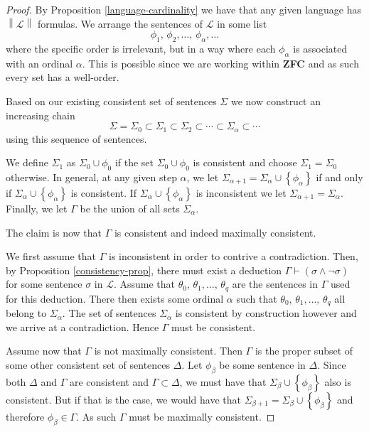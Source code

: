 \documentclass[../../main.tex]{subfiles}
\begin{document}
\begin{proof} 
    By Proposition \ref{language-cardinality} we have that any given language has $\left\lVert \mathcal{L}\right\rVert$ formulas.
    We arrange the sentences of $\mathcal{L}$ in some list
    $$\phi_1,\, \phi_2,\ldots,\, \phi_{\alpha},\ldots$$
    where the specific order is irrelevant, but in a way where each $\phi_{\alpha}$ is associated with an ordinal $\alpha$.
    This is possible since we are working within \textbf{ZFC} and as such every set has a well-order.

    Based on our existing consistent set of sentences $\Sigma$ we now construct an increasing chain
    $$\Sigma = \Sigma_0 \subset \Sigma_1 \subset \Sigma_2 \subset \cdots \subset \Sigma_{\alpha} \subset \cdots$$
    using this sequence of sentences.
    
    We define $\Sigma_1$ as $\Sigma_0 \cup \phi_0$ if the set $\Sigma_0 \cup \phi_0$ is consistent and choose $\Sigma_1 = \Sigma_0$ otherwise.
    In general, at any given step $\alpha$, we let $\Sigma_{\alpha + 1} = \Sigma_{\alpha} \cup \left\{\phi_{\alpha}\right\}$
    if and only if $\Sigma_{\alpha} \cup \left\{\phi_{\alpha}\right\}$ is consistent.
    If $\Sigma_{\alpha} \cup \left\{\phi_{\alpha}\right\}$ is inconsistent we let $\Sigma_{\alpha + 1} = \Sigma_{\alpha}$.
    Finally, we let $\Gamma$ be the union of all sets $\Sigma_{\alpha}$.

    The claim is now that $\Gamma$ is consistent and indeed maximally consistent.

    We first assume that $\Gamma$ is inconsistent in order to contrive a contradiction.
    Then, by Proposition \ref{consistency-prop}, there must exist a deduction $\Gamma \vdash \left(\sigma \wedge \lnot\sigma\right)$ for some sentence $\sigma$ in $\mathcal{L}$.
    Assume that $\theta_0,\, \theta_1, \ldots,\, \theta_q$ are the sentences in $\Gamma$ used for this deduction.
    There then exists some ordinal $\alpha$ such that $\theta_0,\, \theta_1, \ldots,\, \theta_q$ all belong to $\Sigma_{\alpha}$.
    The set of sentences $\Sigma_{\alpha}$ is consistent by construction however and we arrive at a contradiction.
    Hence $\Gamma$ must be consistent.

    Assume now that $\Gamma$ is not maximally consistent.
    Then $\Gamma$ is the proper subset of some other consistent set of sentences $\Delta$.
    Let $\phi_{\beta}$ be some sentence in $\Delta$.
    Since both $\Delta$ and $\Gamma$ are consistent and $\Gamma \subset \Delta$, 
    we must have that $\Sigma_{\beta} \cup \left\{\phi_{\beta}\right\}$ also is consistent.
    But if that is the case, we would have that $\Sigma_{\beta + 1} = \Sigma_{\beta} \cup \left\{\phi_{\beta}\right\}$ and therefore $\phi_{\beta} \in \Gamma$.
    As such $\Gamma$ must be maximally consistent.
\end{proof}
\end{document}
